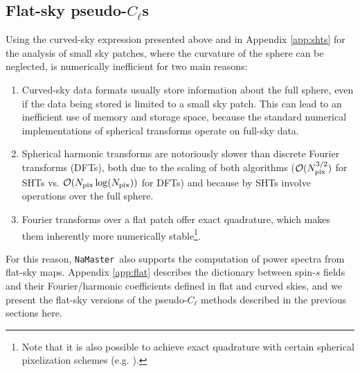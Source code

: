 \documentclass[usenatbib]{mnrasb}
\newcommand{\nmt}{{\tt NaMaster}}
\begin{document}
    \subsection{Flat-sky pseudo-\texorpdfstring{$C_\ell$}{Cl}s}\label{ssec:maths.flat}
      Using the curved-sky expression presented above and in Appendix \ref{app:shts} for the analysis of small sky patches, where the curvature of the sphere can be neglected, is numerically inefficient for two main reasons:
      \begin{enumerate}
        \item Curved-sky data formats usually store information about the full sphere, even if the data being stored is limited to a small sky patch. This can lead to an inefficient use of memory and storage space, because the standard numerical implementations of spherical transforms operate on full-sky data.
        \item Spherical harmonic transforms are notoriously slower than discrete Fourier transforms (DFTs), both due to the scaling of both algorithms (${\cal O}(N_{\rm pix}^{3/2})$ for SHTs vs. ${\cal O}(N_{\rm pix}\log(N_{\rm pix}))$ for DFTs) and because by SHTs involve operations over the full sphere.
        \item Fourier transforms over a flat patch offer exact quadrature, which makes them inherently more numerically stable\footnote{Note that it is also possible to achieve exact quadrature with certain spherical pixelization schemes (e.g. \cite{2011IJMPD..20.1053D}).}.
      \end{enumerate}
      For this reason, \nmt\, also supports the computation of power spectra from flat-sky maps. Appendix \ref{app:flat} describes the dictionary between spin-$s$ fields and their Fourier/harmonic coefficients defined in flat and curved skies, and we present the flat-sky versions of the pseudo-$C_\ell$ methods described in the previous sections here.
      
\end{document}
